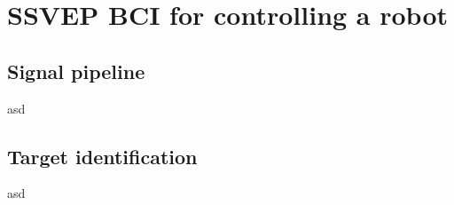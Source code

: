 
\chapter{SSVEP BCI for controlling a robot}
\section{Signal pipeline}
asd
\section{Target identification}
asd